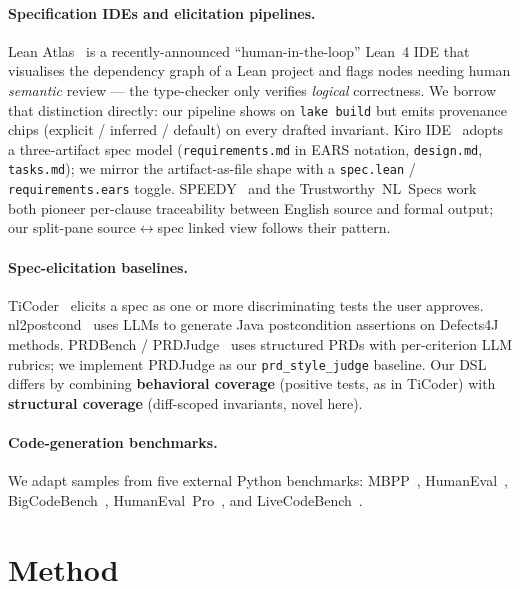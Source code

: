 \documentclass{article}
\begin{document}
\paragraph{Specification IDEs and elicitation pipelines.}
Lean Atlas~\cite{leanatlas2026} is a recently-announced ``human-in-the-loop'' Lean~4 IDE that visualises the dependency graph of a Lean project and flags nodes needing human \emph{semantic} review --- the type-checker only verifies \emph{logical} correctness. We borrow that distinction directly: our pipeline shows \checkmark{} on \texttt{lake build} but emits provenance chips (explicit / inferred / default) on every drafted invariant. Kiro IDE~\cite{kiro2026} adopts a three-artifact spec model (\texttt{requirements.md} in EARS notation, \texttt{design.md}, \texttt{tasks.md}); we mirror the artifact-as-file shape with a \texttt{spec.lean} / \texttt{requirements.ears} toggle. SPEEDY~\cite{speedy2014} and the Trustworthy~NL~Specs work~\cite{trustworthynl2023} both pioneer per-clause traceability between English source and formal output; our split-pane source$\leftrightarrow$spec linked view follows their pattern.

\paragraph{Spec-elicitation baselines.}
TiCoder~\cite{ticoder2022} elicits a spec as one or more discriminating tests the user approves. nl2postcond~\cite{nl2postcond2024} uses LLMs to generate Java postcondition assertions on Defects4J methods. PRDBench / PRDJudge~\cite{prdbench2026} uses structured PRDs with per-criterion LLM rubrics; we implement PRDJudge as our \texttt{prd\_style\_judge} baseline. Our DSL differs by combining \textbf{behavioral coverage} (positive tests, as in TiCoder) with \textbf{structural coverage} (diff-scoped invariants, novel here).

\paragraph{Code-generation benchmarks.}
We adapt samples from five external Python benchmarks: MBPP~\cite{mbpp2021}, HumanEval~\cite{humaneval2021}, BigCodeBench~\cite{bigcodebench2024}, HumanEval~Pro~\cite{humanevalpro2025}, and LiveCodeBench~\cite{livecodebench2025}.

\section{Method}
\end{document}

